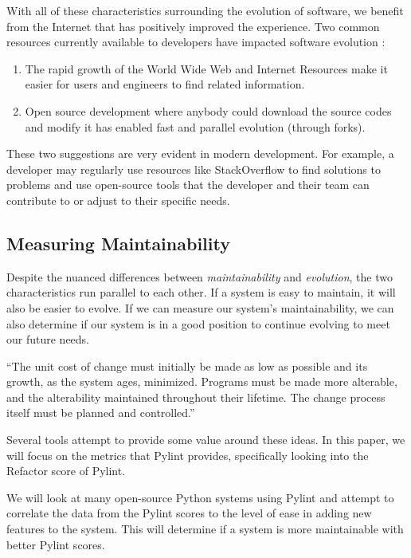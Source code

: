 With all of these characteristics surrounding the evolution of software, we benefit from the Internet that has positively improved the experience. Two common resources currently available to developers have impacted software evolution \cite{wiki:software-evolution}:

\vspace{0.25cm}
\begin{enumerate}
    \item The rapid growth of the World Wide Web and Internet Resources make it easier for users and engineers to find related information.
    \item Open source development where anybody could download the source codes and modify it has enabled fast and parallel evolution (through forks).
\end{enumerate}
\vspace{0.25cm}

These two suggestions are very evident in modern development. For example, a developer may regularly use resources like StackOverflow to find solutions to problems and use open-source tools that the developer and their team can contribute to or adjust to their specific needs.

\subsection{Measuring Maintainability} \label{subMeasureMaintainability}

Despite the nuanced differences between \textit{maintainability} and \textit{evolution}, the two characteristics run parallel to each other. If a system is easy to maintain, it will also be easier to evolve. If we can measure our system's maintainability, we can also determine if our system is in a good position to continue evolving to meet our future needs.

\vspace{0.25cm}
\begin{displayquote}
``The unit cost of change must initially be made as low as possible and its growth, as the system ages, minimized. Programs must be made more alterable, and the alterability maintained throughout their lifetime. The change process itself must be planned and controlled.'' \cite{lehman:1980}
\end{displayquote}
\vspace{0.25cm}

Several tools attempt to provide some value around these ideas. In this paper, we will focus on the metrics that Pylint provides, specifically looking into the Refactor score of Pylint.

We will look at many open-source Python systems using Pylint and attempt to correlate the data from the Pylint scores to the level of ease in adding new features to the system. This will determine if a system is more maintainable with better Pylint scores. 

